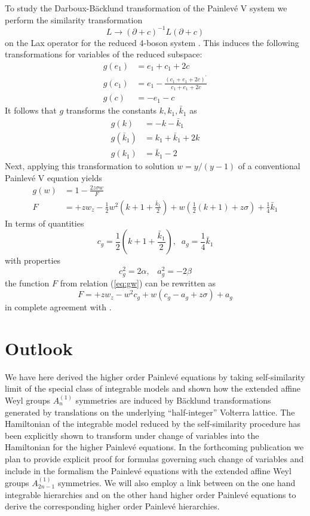 \documentclass[12pt]{article}
\numberwithin{equation}{section}
\def\rf#1{(\ref{eq:#1})}
\def\lab#1{\label{eq:#1}}
\begin{document}
To study the Darboux-B\"acklund transformation of  the Painlev\'e V 
system we perform the similarity transformation
\[
L \to \left(\partial+c\right) ^{-1} L \left(\partial+c\right) 
\]
on the Lax operator for the reduced 4-boson system \cite{Aratyn:1994vc}.
This induces the following transformations for variables of the reduced subspace:
\[ \begin{split}
g\left( e_1 \right)&=e_1+c_1+2c \\
g\left( c_1 \right)&=e_1-\frac{\left(c_1+e_1+2c\right)^{\prime}}{c_1+e_1+2c}\\
g \left( c\right)&=-e_1-c 
\end{split}
\]
It follows that $g$ transforms the constants
$k,k_1, {\bar k}_1$ as
\begin{equation} \begin{split}
g(k) &= -k-{\bar k}_1\\
g({\bar k}_1) &= k_1+{\bar k}_1+2k\\
g(k_1) &= {\bar k}_1-2
\lab{gks}
\end{split}
\end{equation}
Next, applying this transformation to solution $w=y/(y-1) $ 
of a  conventional Painlev\'e V equation
yields
\begin{equation}
\begin{split}
g (w) &=1 - \frac{2 z \sigma w }{F} \\
F&= + z w_z - \frac12 w^2 \left(k+1+\frac{{\bar k}_1}{2}\right)
+ w \left( \frac12 (k+1)+z \sigma \right) + \frac14 {\bar k}_1
\lab{gw}
\end{split}
\end{equation}
In terms of quantities
\[
c_g= \frac12  \left(k+1+\frac{{\bar k}_1}{2}\right), \;\;
a_g = \frac14 {\bar k}_1
\]
with properties
\[c_g^2 = 2 \alpha , \;\;\; a_g^2 = - 2 \beta
\]
the function $F$ from relation \rf{gw} can be rewritten as
\[
F= + z w_z -  w^2 c_g
+ w \left( c_g-a_g+z \sigma \right) + a_g
\]
in complete agreement with \cite{Gromak1976,Gromak2002}.

\section{Outlook}
\label{section:outlook}
We have here derived the higher order Painlev\'e equations by taking self-similarity 
limit of the special class of integrable models and shown 
how the extended affine Weyl groups $A^{(1)}_n$ symmetries are induced
by B\"acklund transformations generated by translations on the underlying
``half-integer'' Volterra lattice. 
The Hamiltonian of the integrable model reduced by the self-similarity
procedure
has been explicitly shown to transform under change of variables into
the Hamiltonian for the higher Painlev\'e equations.
In the forthcoming publication we plan to provide explicit proof for 
formulas governing such change of variables and include in the
formalism the Painlev\'e equations with the extended affine Weyl 
groups $A^{(1)}_{2n-1}$ symmetries.
We will also employ a link between
on the one hand integrable hierarchies and on the other hand higher 
order Painlev\'e equations to derive  the corresponding
higher order Painlev\'e hierarchies.
\end{document}
